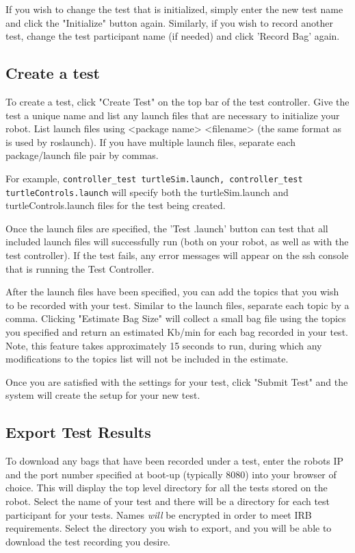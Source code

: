 \documentclass[onecolumn, draftclsnofoot,10pt, compsoc]{report}
\begin{document}
If you wish to change the test that is initialized, simply enter the new test name and click the "Initialize" button again. Similarly, if you wish to record another test, change the test participant name (if needed) and click 'Record Bag' again.

\subsection{Create a test}
To create a test, click "Create Test" on the top bar of the test controller. Give the test a unique name and list any launch files that are necessary to initialize your robot. List launch files using <package name> <filename> (the same format as is used by roslaunch). If you have multiple launch files, separate each package/launch file pair by commas. 

For example, \texttt{controller\_test turtleSim.launch, controller\_test turtleControls.launch} will specify both the turtleSim.launch and turtleControls.launch files for the test being created.

Once the launch files are specified, the 'Test .launch' button can test that all included launch files will successfully run (both on your robot, as well as with the test controller). If the test fails, any error messages will appear on the ssh console that is running the Test Controller. 

After the launch files have been specified, you can add the topics that you wish to be recorded with your test. Similar to the launch files, separate each topic by a comma. Clicking "Estimate Bag Size" will collect a small bag file using the topics you specified and return an estimated Kb/min for each bag recorded in your test. Note, this feature takes approximately 15 seconds to run, during which any modifications to the topics list will not be included in the estimate. 

Once you are satisfied with the settings for your test, click "Submit Test" and the system will create the setup for your new test. 

\subsection{Export Test Results}
To download any bags that have been recorded under a test, enter the robots IP and the port number specified at boot-up (typically 8080) into your browser of choice. This will display the top level directory for all the tests stored on the robot. Select the name of your test and there will be a directory for each test participant for your tests. Names \textit{will} be encrypted in order to meet IRB requirements. Select the directory you wish to export, and you will be able to download the test recording you desire.
\end{document}
